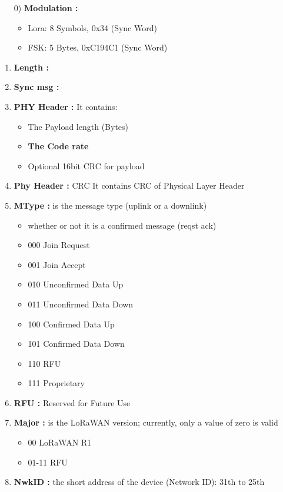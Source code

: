 \begin{landscape}
\scriptsize
\begin{multicols}{2}
\begin{itemize}
	\item[0)] \textbf{Modulation :}
	\begin{itemize}
		\item Lora:  8 Symbols, 0x34 (Sync Word)
		\item FSK:  5 Bytes, 0xC194C1 (Sync Word)
	\end{itemize}
\end{itemize}
\begin{enumerate}
	\item \textbf{Length :}
	\item \textbf{Sync msg :}
	\item \textbf{PHY Header :}  It contains:
	\begin{itemize}
		\item The Payload length (Bytes)
		\item \textbf{The Code rate}
		\item Optional 16bit CRC for payload 
	\end{itemize}
	\item \textbf{Phy Header :} CRC  It contains CRC of Physical Layer Header
	\item \textbf{MType :}  is the message type (uplink or a downlink)
	\begin{itemize}
		\item whether or not it is a confirmed message (reqst ack)
		\item 000 	Join Request
		\item 001 	Join Accept
		\item 010 	Unconfirmed Data Up
		\item 011 	Unconfirmed Data Down
		\item 100 	Confirmed Data Up
		\item 101 	Confirmed Data Down
		\item 110 	RFU
		\item 111 	Proprietary
	\end{itemize}
	\item \textbf{RFU :} Reserved for Future Use
	\item \textbf{Major :}  is the LoRaWAN version; currently, only a value of zero is valid
	\begin{itemize}
		\item 00 	LoRaWAN R1
		\item 01-11 	RFU
	\end{itemize}
	\item \textbf{NwkID :} the short address of the device (Network ID): 31th to 25th

\end{enumerate}
\end{multicols}
\end{landscape}
